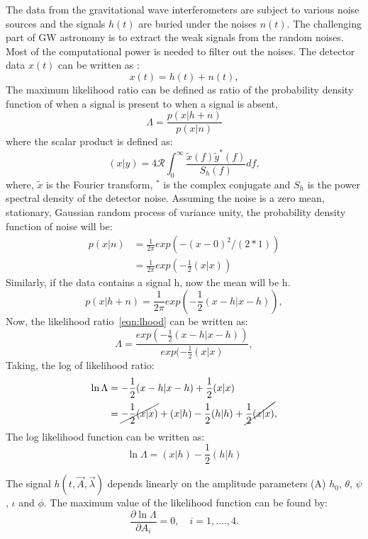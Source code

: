 \documentclass{ttuthes2007}
\begin{document}
The data from the gravitational wave interferometers are subject to various
noise sources and the signals $h(t)$ are buried under the noises $n(t)$. The challenging part
of \ac{GW} astronomy is to extract the weak signals from the random noises.
Most of the computational power is needed to filter out the noises. The
detector data $x(t)$ can be written as :
\begin{equation}
x(t) = h(t)+n(t),
\end{equation}
The maximum likelihood ratio can be defined as ratio of the probability density function
of when a signal is present to when a signal is absent,
\begin{equation}\label{eqn:lhood}
\Lambda = \frac{p(x|h+n)}{p(x|n)}
\end{equation}
where the scalar product is defined as:
\begin{equation}
(x|y)=4\mathcal{R} \int_{0}^{\infty}\frac{\tilde{x}(f)\tilde{y}^*(f)}{S_h(f)}df, 
\end{equation}
where, $\tilde{x}$ is the Fourier transform, $^*$ is the complex conjugate and 
$S_h$ is the power spectral density of the detector noise.
Assuming the noise is a zero mean, stationary, Gaussian random process of
variance unity, the probability density function of noise will be:
\begin{align*}
p(x|n) & = \frac{1}{2\pi}exp(-(x-0)^2/(2*1))\\
&= \frac{1}{2\pi} exp(-\frac{1}{2}(x|x))
\end{align*}
Similarly, if the data contains a signal h, now the mean will be h.
\begin{equation}
p(x|h+n)=\frac{1}{2\pi} exp(-\frac{1}{2}(x-h|x-h)),
\end{equation}
Now, the likelihood ratio~\ref{eqn:lhood} can be written as:
\begin{equation}
\Lambda= \frac{exp(-\frac{1}{2}(x-h|x-h))}{exp(-\frac{1}{2}(x|x)},
\end{equation}
Taking, the log of likelihood ratio:
\begin{align*}
\ln{\Lambda} & =-\frac{1}{2}(x-h|x-h) + \frac{1}{2}(x|x)\\
& = \cancel{-\frac{1}{2}(x|x)}
+(x|h)-\frac{1}{2}(h|h)+\cancel{\frac{1}{2}(x|x)},
\end{align*}
The log likelihood function can be written as:
\begin{equation}
\ln{\Lambda}=(x|h)-\frac{1}{2}(h|h)
\end{equation}

The signal $h(t,\vec{A},\vec{\lambda})$ depends linearly on the amplitude
parameters (A)
$h_0$, $\theta$, $\psi$, $\iota$ and $\phi$. The maximum value of the likelihood
function can be found by:
\begin{equation}
\frac{\partial\ln\Lambda}{\partial A_i}= 0, \quad i=1,....,4.  
\end{equation}
\end{document}
